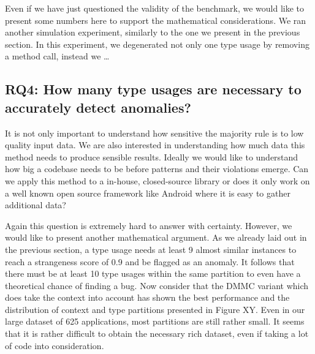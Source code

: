 Even if we have just questioned the validity of the benchmark, we would like to present some numbers here to support the mathematical considerations.
We ran another simulation experiment, similarly to the one we present in the previous section.
In this experiment, we degenerated not only one type usage by removing a method call, instead we  \ldots
{}


\subsection{RQ4: How many type usages are necessary to accurately detect anomalies?}

It is not only important to understand how sensitive the majority rule is to low quality input data.
We are also interested in understanding how much data this method needs to produce sensible results.
Ideally we would like to understand how big a codebase needs to be before patterns and their violations emerge.
Can we apply this method to a in-house, closed-source library or does it only work on a well known open source framework like Android where it is easy to gather additional data?

Again this question is extremely hard to answer with certainty.
However, we would like to present another mathematical argument. 
As we already laid out in the previous section, a type usage needs at least 9 almost similar instances to reach a strangeness score of 0.9 and be flagged as an anomaly.
It follows that there must be at least 10 type usages within the same partition to even have a theoretical chance of finding a bug.
Now consider that the $\text{DMMC}$ variant which does take the context into account has shown the best performance and the distribution of context and type partitions presented in Figure XY.
Even in our large dataset of 625 applications, most partitions are still rather small. 
It seems that it is rather difficult to obtain the necessary rich dataset, even if taking a lot of code into consideration.

